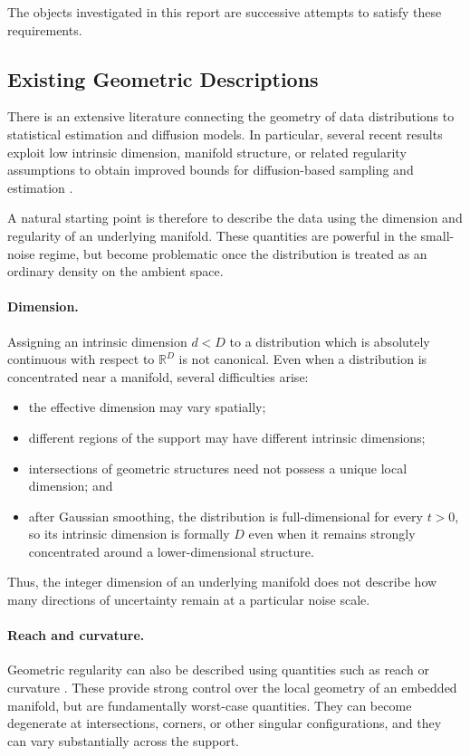 \documentclass{article}
\newcommand{\R}{\mathbb{R}}
\theoremstyle{plain}
\theoremstyle{definition}
\theoremstyle{remark}
\begin{document}
The objects investigated in this report are successive attempts to satisfy these requirements.

\subsection{Existing Geometric Descriptions}
\label{subsec:existing-work}

There is an extensive literature connecting the geometry of data distributions to statistical estimation and diffusion models. In particular, several recent results exploit low intrinsic dimension, manifold structure, or related regularity assumptions to obtain improved bounds for diffusion-based sampling and estimation \citep{benton2024nearly,potaptchik2024linear,liang2025low}.

A natural starting point is therefore to describe the data using the dimension and regularity of an underlying manifold. These quantities are powerful in the small-noise regime, but become problematic once the distribution is treated as an ordinary density on the ambient space.

\paragraph{Dimension.}
Assigning an intrinsic dimension $d<D$ to a distribution which is absolutely continuous with respect to $\R^D$ is not canonical. Even when a distribution is concentrated near a manifold, several difficulties arise:

\begin{itemize}
\item the effective dimension may vary spatially;
\item different regions of the support may have different intrinsic dimensions;
\item intersections of geometric structures need not possess a unique local dimension; and
\item after Gaussian smoothing, the distribution is full-dimensional for every $t>0$, so its intrinsic dimension is formally $D$ even when it remains strongly concentrated around a lower-dimensional structure.
\end{itemize}

Thus, the integer dimension of an underlying manifold does not describe how many directions of uncertainty remain at a particular noise scale.

\paragraph{Reach and curvature.}
Geometric regularity can also be described using quantities such as reach or curvature \citep{federer1959curvature}. These provide strong control over the local geometry of an embedded manifold, but are fundamentally worst-case quantities. They can become degenerate at intersections, corners, or other singular configurations, and they can vary substantially across the support.
\end{document}
